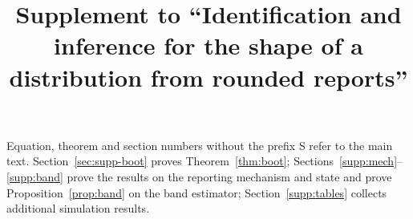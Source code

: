 \documentclass[12pt]{article}
\title{Supplement to ``Identification and inference for the shape of a distribution from rounded reports''}
\author{}
\date{}
\theoremstyle{definition}
\theoremstyle{remark}
\begin{document}
\maketitle
\noindent Equation, theorem and section numbers without the prefix S refer to the main text. Section~\ref{sec:supp-boot} proves Theorem~\ref{thm:boot}; Sections~\ref{supp:mech}--\ref{supp:band} prove the results on the reporting mechanism and state and prove Proposition~\ref{prop:band} on the band estimator; Section~\ref{supp:tables} collects additional simulation results.






\end{document}
